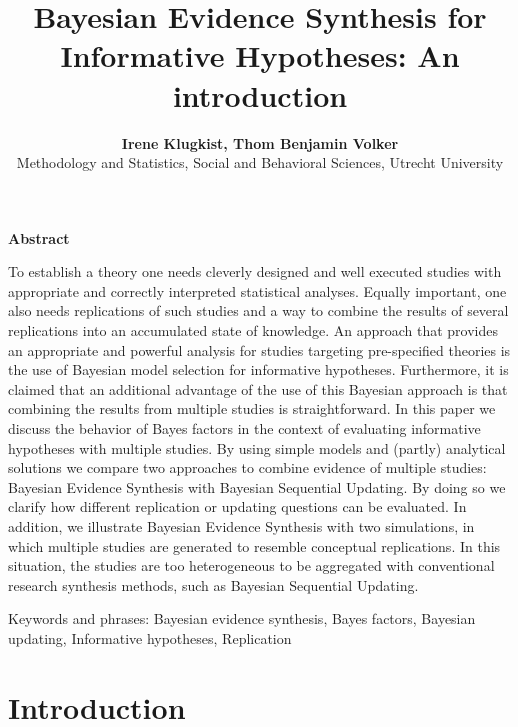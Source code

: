 \documentclass[11pt,reqno]{article}
\begin{document}
\titlepage
\title{\textbf{Bayesian Evidence Synthesis for Informative Hypotheses: An introduction}}
\author{\textbf{Irene Klugkist, Thom Benjamin Volker} \\
Methodology and Statistics, Social and Behavioral Sciences, Utrecht University} \maketitle



\noindent \textbf{Abstract}

\noindent To establish a theory one needs cleverly designed and well executed studies with appropriate and correctly interpreted statistical analyses. Equally important, one also needs replications of such studies and a way to combine the results of several replications into an accumulated state of knowledge. An approach that provides an appropriate and powerful analysis for studies targeting pre-specified theories is the use of Bayesian model selection for informative hypotheses. Furthermore, it is claimed that an additional advantage of the use of this Bayesian approach is that combining the results from multiple studies is straightforward. In this paper we discuss the behavior of Bayes factors in the context of evaluating informative hypotheses with multiple studies. By using simple models and (partly) analytical solutions we compare two approaches to combine evidence of multiple studies: Bayesian Evidence Synthesis with Bayesian Sequential Updating. By doing so we clarify how different replication or updating questions can be evaluated. In addition, we illustrate Bayesian Evidence Synthesis with two simulations, in which multiple studies are generated to resemble conceptual replications. In this situation, the studies are too heterogeneous to be aggregated with conventional research synthesis methods, such as Bayesian Sequential Updating.


\bigskip

\noindent Keywords and phrases: Bayesian evidence synthesis, Bayes factors, Bayesian updating, Informative hypotheses, Replication


\newpage

\section{Introduction}
\label{intro}
\end{document}
